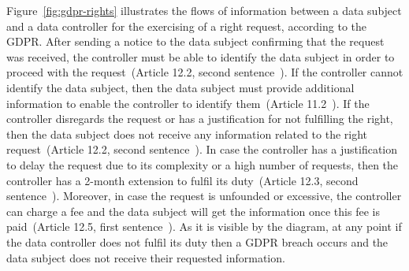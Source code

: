Figure~\ref{fig:gdpr-rights} illustrates the flows of information between a data subject and a data controller for the exercising of a right request, according to the GDPR.
After sending a notice to the data subject confirming that the request was received, the controller must be able to identify the data subject in order to proceed with the request~(Article 12.2, second sentence~\citeyearpar{noauthor_regulation_2016}).
If the controller cannot identify the data subject, then the data subject must provide additional information to enable the controller to identify them~(Article 11.2~\citeyearpar{noauthor_regulation_2016}).
If the controller disregards the request or has a justification for not fulfilling the right, then the data subject does not receive any information related to the right request~(Article 12.2, second sentence~\citeyearpar{noauthor_regulation_2016}).
In case the controller has a justification to delay the request due to its complexity or a high number of requests, then the controller has a 2-month extension to fulfil its duty~(Article 12.3,
second sentence~\citeyearpar{noauthor_regulation_2016}).
Moreover, in case the request is unfounded or excessive, the controller can charge a fee and the data subject will get the information once this fee is paid~(Article 12.5, first sentence~\citeyearpar{noauthor_regulation_2016}).
As it is visible by the diagram, at any point if the data controller does not fulfil its duty then a GDPR breach occurs and the data subject does not receive their requested information.

